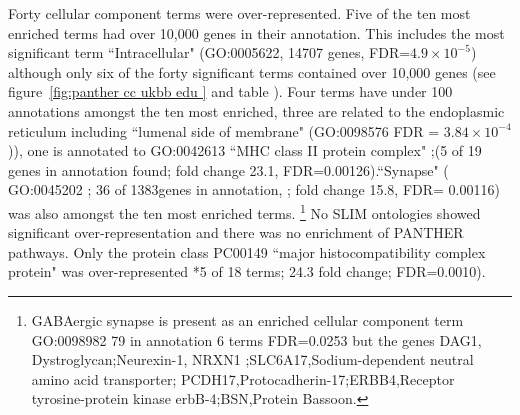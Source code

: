             
    Forty cellular component terms were over-represented.  Five of the ten most enriched terms had over 10,000 genes in their annotation. This includes the most significant term ``Intracellular" (GO:0005622, 14707 genes, FDR=$4.9\times10^{-5}$) although only six of the forty significant terms contained over 10,000 genes (see figure~\ref{fig:panther cc ukbb edu } and table \label{tab:GO cellular component complete Education Discovery FDRover represenation only}). Four terms have under 100 annotations amongst the ten most enriched, three are related to the endoplasmic reticulum  including  ``lumenal side of membrane" (GO:0098576 FDR =   $3.84\times10^{-4}$)), one is annotated to GO:0042613 ``MHC class II protein complex" ;(5 of 19 genes in annotation found;  fold change 23.1, FDR=0.00126).``Synapse" ( GO:0045202  ;   36 of 1383genes in annotation,    ; fold change 15.8,  FDR= 0.00116) was also amongst the ten most enriched terms.    \footnote{ GABAergic synapse is present as an enriched cellular component term GO:0098982 79 in annotation 6 terms FDR=0.0253 but the genes DAG1, Dystroglycan;Neurexin-1, NRXN1 ;SLC6A17,Sodium-dependent neutral amino acid transporter; PCDH17,Protocadherin-17;ERBB4,Receptor tyrosine-protein kinase erbB-4;BSN,Protein Bassoon.} No SLIM ontologies showed significant over-representation and there was no enrichment of PANTHER pathways. Only the protein class PC00149 ``major histocompatibility complex protein" was over-represented  *5 of 18 terms; 24.3 fold change; FDR=0.0010).

            

